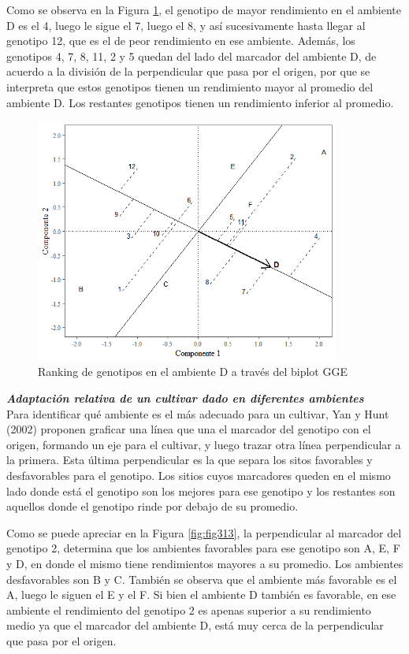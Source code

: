 Como se observa en la Figura \ref{fig:fig312}, el genotipo de mayor rendimiento en el ambiente D es el 4, luego le sigue el 7, luego el 8, y así sucesivamente hasta llegar al genotipo 12, que es el de peor rendimiento en ese ambiente. Además, 
los genotipos 4, 7, 8, 11, 2 y 5 quedan del lado del marcador del ambiente D, de acuerdo a la división de la perpendicular que pasa por el origen, por que se interpreta que estos genotipos tienen un rendimiento mayor al promedio del ambiente D. Los restantes genotipos tienen un rendimiento inferior al promedio.

\begin{figure}[H]
	\begin{center}
		\includegraphics[width=10cm]{./Graficos/env_GGE.png}
	\end{center}
	\caption{Ranking de genotipos en el ambiente D a través del biplot GGE}
	\label{fig:fig312}
\end{figure}



\textbf{\emph{Adaptación relativa de un cultivar dado en diferentes ambientes}}\\

Para identificar qué ambiente es el más adecuado para un cultivar, Yan y Hunt (2002) proponen graficar una línea que una el marcador del genotipo con el origen, formando un eje para el cultivar, y luego trazar otra línea perpendicular a la primera. Esta última perpendicular es la que separa los sitos favorables y desfavorables para el genotipo. Los sitios cuyos marcadores queden en el mismo lado donde está el genotipo son los mejores para ese genotipo y los restantes son aquellos donde el genotipo rinde por debajo de su promedio.



Como se puede apreciar en la Figura \ref{fig:fig313}, la perpendicular al marcador del genotipo 2, determina que los ambientes favorables para ese genotipo son A, E, F y D, en donde el mismo tiene rendimientos mayores a su promedio. Los ambientes desfavorables son B y C.
También se observa que el ambiente más favorable es el A, luego le siguen el E y el F. Si bien el ambiente D también es favorable, en ese ambiente el rendimiento del genotipo 2 es apenas superior a su rendimiento medio ya que el marcador del ambiente D, está muy cerca de la perpendicular que pasa por el origen.

